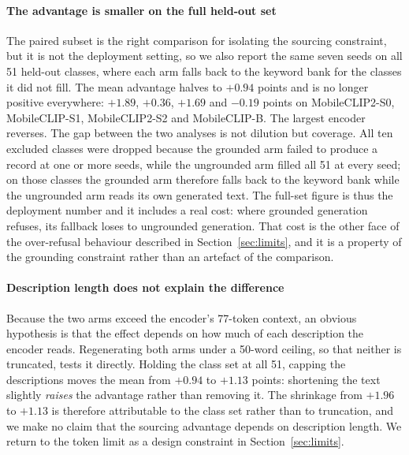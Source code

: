 \documentclass[a4paper,fleqn]{cas-dc}
\begin{document}
\paragraph{The advantage is smaller on the full held-out set} The paired subset is the right
comparison for isolating the sourcing constraint, but it is not the deployment setting, so we also
report the same seven seeds on all 51 held-out classes, where each arm falls back to the keyword
bank for the classes it did not fill. The mean advantage halves to $+0.94$ points and is no longer
positive everywhere: $+1.89$, $+0.36$, $+1.69$ and $-0.19$ points on MobileCLIP2-S0, MobileCLIP-S1,
MobileCLIP2-S2 and MobileCLIP-B. The largest encoder reverses. %
The gap between the two analyses is
not dilution but coverage. All ten excluded classes were dropped because the grounded arm failed to
produce a record at one or more seeds, while the ungrounded arm filled all 51 at every seed; on
those classes the grounded arm therefore falls back to the keyword bank while the ungrounded arm
reads its own generated text. The full-set figure is thus the deployment number and it includes a
real cost: where grounded generation refuses, its fallback loses to ungrounded generation. That cost
is the other face of the over-refusal behaviour described in Section~\ref{sec:limits}, and it is a
property of the grounding constraint rather than an artefact of the comparison.

\paragraph{Description length does not explain the difference} Because the two arms exceed the
encoder's 77-token context, an obvious hypothesis is that the effect depends on how much of each
description the encoder reads. Regenerating both arms under a 50-word ceiling, so that neither is
truncated, tests it directly. Holding the class set at all 51, capping the descriptions moves the
mean from $+0.94$ to $+1.13$ points: shortening the text slightly \emph{raises} the advantage
rather than removing it. The shrinkage from $+1.96$ to $+1.13$ is therefore attributable to the
class set rather than to truncation, and we make no claim that the sourcing advantage depends on
description length. We return to the token limit as a design constraint in
Section~\ref{sec:limits}.
\end{document}
